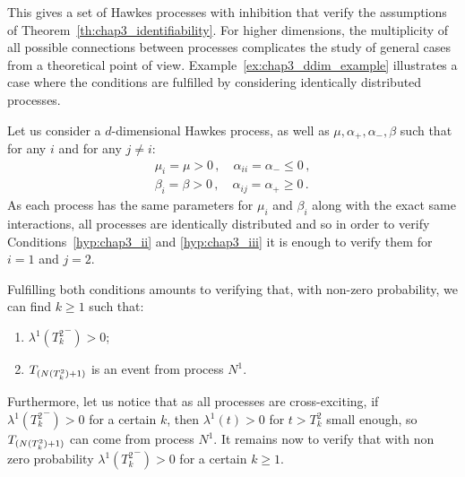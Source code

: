     This gives a set of Hawkes processes with inhibition that verify the assumptions of Theorem~\ref{th:chap3_identifiability}. For higher dimensions, the multiplicity of all possible connections between processes complicates the study of general cases from a theoretical point of view. Example~\ref{ex:chap3_ddim_example} illustrates a case where the conditions are fulfilled by considering identically distributed processes.

    \begin{example}\label{ex:chap3_ddim_example}
        Let us consider a $d$-dimensional Hawkes process,
        as well as $\mu, \alpha_+, \alpha_-, \beta$ such that for any $i$ and for any $j\neq i$:
        \begin{align*}
    	\mu_i = \mu > 0\,,     \quad    \alpha_{ii} = \alpha_- \leq 0\,,\\ 
	    \beta_i = \beta > 0\,, \quad \alpha_{ij} = \alpha_+ \geq 0\,.
        \end{align*}
        As each process has the same parameters for $\mu_i$ and $\beta_i$ along with the exact same interactions, all processes are identically distributed and so in order to verify Conditions~\ref{hyp:chap3_ii} and \ref{hyp:chap3_iii} it is enough to verify them for $i=1$ and $j=2$.

        Fulfilling both conditions amounts to verifying that, with non-zero probability, we can find $k\ge1$ such that:
        \begin{enumerate}
            \item $\lambda^1({T_k^2}^-) > 0$;
            \item $T\park[N(T_k^2) + 1]$ is an event from process $N^1$.
        \end{enumerate}

        Furthermore, let us notice that as all processes are cross-exciting, if $\lambda^1({T_k^2}^-) > 0$ for a certain $k$, then $\lambda^1(t) > 0$ for $t>T_k^2$ small enough, so $T\park[N(T_k^2) + 1]$ can come from process $N^1$. It remains now to verify that with non zero probability $\lambda^1({T_k^2}^-) > 0$ for a certain $k\ge1$. 


\end{example}
